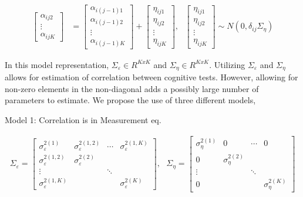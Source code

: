 \documentclass[
]{article}
\begin{document}
\begin{equation*}
\begin{aligned}
\begin{bmatrix}
\alpha_{ij2}\\
\vdots\\
\alpha_{ijK}
\end{bmatrix} & = 
\begin{bmatrix}
\alpha_{i(j-1)1}\\
\alpha_{i(j-1)2}\\
\vdots\\
\alpha_{i(j-1)K}
\end{bmatrix} +
\begin{bmatrix}
\eta_{ij1}\\
\eta_{ij2}\\
\vdots\\
\eta_{ijK}
\end{bmatrix}, \ \ \
\begin{bmatrix}
\eta_{ij1}\\
\eta_{ij2}\\
\vdots\\
\eta_{ijK}
\end{bmatrix} \sim N(0, \delta_{ij}\Sigma_\eta)
\end{aligned}
\end{equation*}

In this model representation, \(\Sigma_\varepsilon \in R^{KxK}\) and \(\Sigma_\eta \in R^{KxK}\). Utilizing \(\Sigma_\varepsilon\) and \(\Sigma_\eta\) allows for estimation of correlation between cognitive tests. However, allowing for non-zero elements in the non-diagonal adds a possibly large number of parameters to estimate. We propose the use of three different models,

Model 1: Correlation is in Measurement eq.

\begin{equation*}
\begin{aligned}
\Sigma_\varepsilon =
\begin{bmatrix}
\sigma^{2(1)}_\varepsilon & \sigma^{2(1,2)}_\varepsilon & \cdots & \sigma^{2(1, K)}_\varepsilon\\
\sigma^{2(1,2)}_\varepsilon & \sigma^{2(2)}_\varepsilon\\
\vdots & & \ddots\\
\sigma^{2(1, K)}_\varepsilon & & &\sigma^{2(K)}_\varepsilon
\end{bmatrix},
\ \ \ 
\Sigma_\eta = 
\begin{bmatrix}
\sigma^{2(1)}_\eta & 0 & \cdots & 0\\
0 & \sigma^{2(2)}_\eta\\
\vdots & & \ddots\\
0 & & &\sigma^{2(K)}_\eta
\end{bmatrix}
\end{aligned}
\end{equation*}
\end{document}
